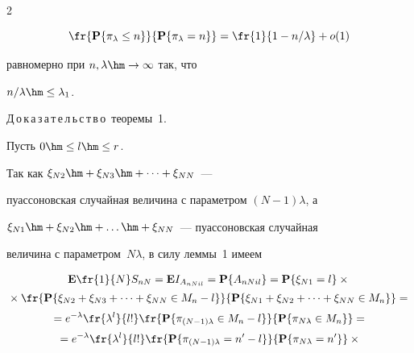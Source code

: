 \begin{multicols}{2}
{$$


\fr{\mathbf{P}\{\pi_{\lambda}\le n\}}{\mathbf{P}\{\pi_{\lambda}=n\}}=\fr{1}{1-{n}/{\lambda}}+


o(1)


$$


 равномерно при $n, \lambda\hm\to\infty$ так, что


 ${n}/{\lambda}\hm\le\lambda_1$.}





\medskip





\noindent


Д\,о\,к\,а\,з\,а\,т\,е\,л\,ь\,с\,т\,в\,о\ теоремы~1.


Пусть $0\hm\le l\hm\le r$.\linebreak


Так как $\xi_{N2}\hm+\xi_{N3}\hm+ \dots +\xi_{NN}$~---


пуассоновская случайная величина с параметром $(N-1)\lambda$, а


$\xi_{N1}\hm+\xi_{N2}\hm+ \dots \hm+\xi_{NN}$~--- пуассоновская случайная


величина с параметром~$N\lambda$, в силу леммы~1 имеем


\begin{multline*}


\mathbf{E}\fr{1}{N}S_{nN}=\mathbf{E} I_{A_{nNil}}=\mathbf{P}\{A_{nNil}\} =


\mathbf{P}\{\xi_{N1}=l\}\times{}\\[2pt]


{}\times \fr{\mathbf{P}\{


 \xi_{N2}+\xi_{N3}+ \dots +\xi_{NN}\in M_n-l\}}{\mathbf{P}\{


 \xi_{N1}+\xi_{N2}+ \dots +\xi_{NN}\in M_n\}}={}\\[2pt]


  {}=


e^{-\lambda}\fr{\lambda^l}{l!}\fr{\mathbf{P}\{\pi_{(N-1)\lambda}\in


M_n-l\}}{\mathbf{P}\{\pi_{N\lambda}\in M_n\}} ={}\\[2pt]


{}=e^{-\lambda}\fr{\lambda^l}{l!}\fr{\mathbf{P}\{\pi_{(N-1)\lambda}=


n'-l\}}{\mathbf{P}\{\pi_{N\lambda}=n'\}}\times{}


 \end{multline*}


 \begin{multline*}



\end{multline*}
\end{multicols}
